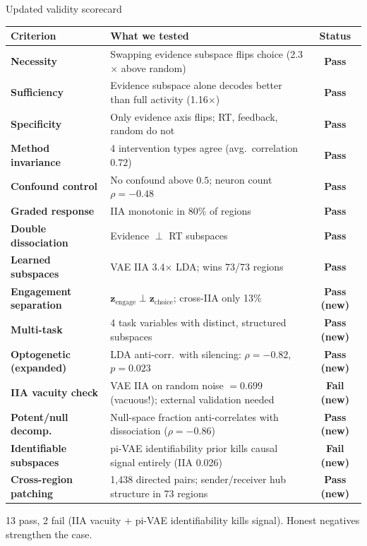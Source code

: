 \documentclass[aspectratio=169,11pt]{beamer}
\begin{document}
\begin{frame}{Updated validity scorecard}
\vspace{-0.5em}
{\scriptsize
\begin{tabular}{lp{7cm}c}
\toprule
\textbf{Criterion} & \textbf{What we tested} & \textbf{Status} \\
\midrule
\textbf{Necessity} & Swapping evidence subspace flips choice (2.3$\times$ above random) & \textcolor{pass}{\textbf{Pass}} \\
\textbf{Sufficiency} & Evidence subspace alone decodes better than full activity (1.16$\times$) & \textcolor{pass}{\textbf{Pass}} \\
\textbf{Specificity} & Only evidence axis flips; RT, feedback, random do not & \textcolor{pass}{\textbf{Pass}} \\
\textbf{Method invariance} & 4 intervention types agree (avg.\ correlation $0.72$) & \textcolor{pass}{\textbf{Pass}} \\
\textbf{Confound control} & No confound above $0.5$; neuron count $\rho = -0.48$ & \textcolor{pass}{\textbf{Pass}} \\
\textbf{Graded response} & IIA monotonic in 80\% of regions & \textcolor{pass}{\textbf{Pass}} \\
\textbf{Double dissociation} & Evidence $\perp$ RT subspaces & \textcolor{pass}{\textbf{Pass}} \\
\textbf{Learned subspaces} & VAE IIA 3.4$\times$ LDA; wins 73/73 regions & \textcolor{pass}{\textbf{Pass}} \\
\textbf{Engagement separation} & $\mathbf{z}_{\text{engage}} \perp \mathbf{z}_{\text{choice}}$; cross-IIA only 13\% & \textcolor{pass}{\textbf{Pass (new)}} \\
\textbf{Multi-task} & 4 task variables with distinct, structured subspaces & \textcolor{pass}{\textbf{Pass (new)}} \\
\textbf{Optogenetic (expanded)} & LDA anti-corr.\ with silencing: $\rho = -0.82$, $p = 0.023$ & \textcolor{pass}{\textbf{Pass (new)}} \\
\textbf{IIA vacuity check} & VAE IIA on random noise $= 0.699$ (vacuous!); external validation needed & \textcolor{fail}{\textbf{Fail (new)}} \\
\textbf{Potent/null decomp.} & Null-space fraction anti-correlates with dissociation ($\rho = -0.86$) & \textcolor{pass}{\textbf{Pass (new)}} \\
\textbf{Identifiable subspaces} & pi-VAE identifiability prior kills causal signal entirely (IIA 0.026) & \textcolor{fail}{\textbf{Fail (new)}} \\
\textbf{Cross-region patching} & 1,438 directed pairs; sender/receiver hub structure in 73 regions & \textcolor{pass}{\textbf{Pass (new)}} \\
\bottomrule
\end{tabular}
}

\vspace{0.3em}
{\small 13 pass, 2 fail (IIA vacuity + pi-VAE identifiability kills signal). Honest negatives strengthen the case.}
\end{frame}
\end{document}
